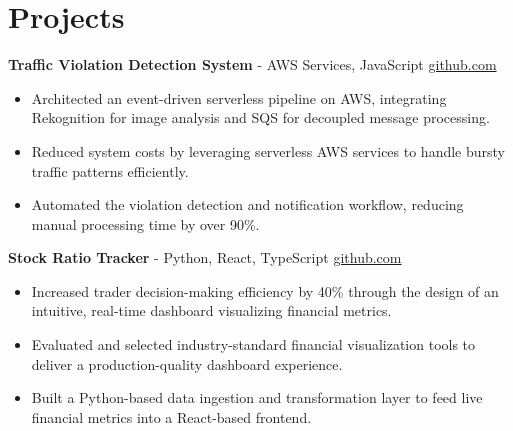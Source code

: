 \documentclass[11pt]{article}       %
\begin{document}

\vspace{-18.5pt}

\section*{Projects}

\textbf{Traffic Violation Detection System}{ - AWS Services, JavaScript} \hfill \href{https://github.com/Monica20030707/AWS_rekonigition-N-read-database}{github.com} \\
\vspace{-9pt}
\begin{itemize}
  \item Architected an event-driven serverless pipeline on AWS, integrating Rekognition for image analysis and SQS for decoupled message processing.
  \item Reduced system costs by leveraging serverless AWS services to handle bursty traffic patterns efficiently.
  \item Automated the violation detection and notification workflow, reducing manual processing time by over 90\%.
\end{itemize}

\textbf{Stock Ratio Tracker}{ - Python, React, TypeScript} \hfill \href{https://github.com/Monica20030707/Trading-Dashboard_UI}{github.com} \\
\vspace{-9pt}
\begin{itemize}
  \item Increased trader decision-making efficiency by 40\% through the design of an intuitive, real-time dashboard visualizing financial metrics.
  \item Evaluated and selected industry-standard financial visualization tools to deliver a production-quality dashboard experience.
  \item Built a Python-based data ingestion and transformation layer to feed live financial metrics into a React-based frontend.
\end{itemize}
\end{document}
